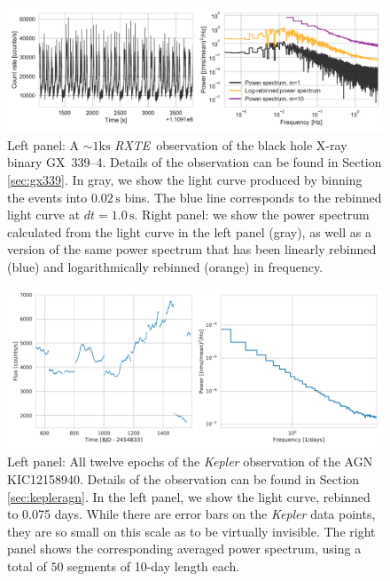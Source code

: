 \documentclass[twocolumn]{aastex62}
\newcommand{\project}[1]{\textsl{#1}\xspace}
\newcommand{\rxte}{\project{RXTE}\xspace}
\begin{document}
\begin{figure}[htbp]
\begin{center}
\includegraphics[width=\textwidth]{example_lc_ps.pdf}
\caption{Left panel: A $\sim 1 \mathrm{ks}$ \rxte\ observation of the black hole X-ray binary GX~339--4. 
Details of the observation can be found in Section \ref{sec:gx339}. 
In gray, we show the light curve produced by binning the events into $0.02\,\mathrm{s}$ bins. 
The blue line corresponds to the rebinned light curve at $dt = 1.0\,\mathrm{s}$. 
Right panel: we show the power spectrum calculated from the light curve in the left panel (gray), as well as a version of the same power spectrum that has been linearly rebinned (blue) and logarithmically rebinned (orange) in frequency.}
\label{fig:psd}
\end{center}
\end{figure}

\begin{figure}[htbp]
\begin{center}
\includegraphics[width=\textwidth]{example_kepler_agn.pdf}
\caption{Left panel: All twelve epochs of the \textit{Kepler} observation of the AGN KIC12158940. 
Details of the observation can be found in Section \ref{sec:kepleragn}. 
In the left panel, we show the light curve, rebinned to 0.075 days. While there are error bars on the \textit{Kepler} data points, they are so small on this scale as to be virtually invisible.
The right panel shows the corresponding averaged power spectrum, using a total of $50$ segments of 10-day length each.}
\label{fig:psd}
\end{center}
\end{figure}
\end{document}
